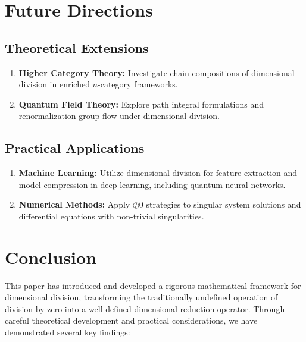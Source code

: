 \documentclass[sn-mathphys-num]{sn-jnl}
\theoremstyle{thmstyleone}
\theoremstyle{thmstyletwo}
\theoremstyle{thmstylethree}
\begin{document}
\section{Future Directions}

\subsection{Theoretical Extensions}
\begin{enumerate}
    \item \textbf{Higher Category Theory:} Investigate chain compositions of dimensional 
          division in enriched $n$-category frameworks.  
    \item \textbf{Quantum Field Theory:} Explore path integral formulations and 
          renormalization group flow under dimensional division.
\end{enumerate}

\subsection{Practical Applications}
\begin{enumerate}
    \item \textbf{Machine Learning:} Utilize dimensional division for feature extraction 
          and model compression in deep learning, including quantum neural networks.  
    \item \textbf{Numerical Methods:} Apply $\oslash 0$ strategies to singular system 
          solutions and differential equations with non-trivial singularities.
\end{enumerate}

\section{Conclusion}
This paper has introduced and developed a rigorous mathematical framework for dimensional division, transforming the traditionally undefined operation of division by zero into a well-defined dimensional reduction operator. Through careful theoretical development and practical considerations, we have demonstrated several key findings:
\end{document}
